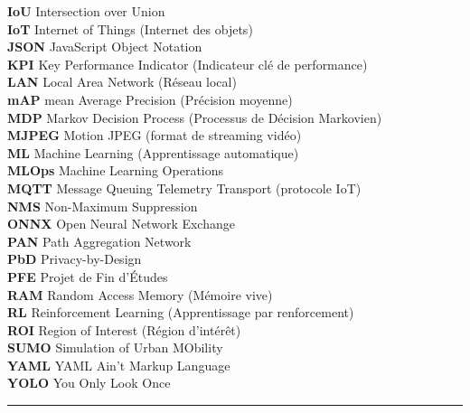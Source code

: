 \begin{tabbing}
\textbf{IoU}   \> Intersection over Union \\[0.2cm]
\textbf{IoT}   \> Internet of Things
               (Internet des objets) \\[0.2cm]
\textbf{JSON}  \> JavaScript Object Notation \\[0.2cm]
\textbf{KPI}   \> Key Performance Indicator
               (Indicateur clé de performance) \\[0.2cm]
\textbf{LAN}   \> Local Area Network
               (Réseau local) \\[0.2cm]
\textbf{mAP}   \> mean Average Precision
               (Précision moyenne) \\[0.2cm]
\textbf{MDP}   \> Markov Decision Process
               (Processus de Décision Markovien) \\[0.2cm]
\textbf{MJPEG} \> Motion JPEG
               (format de streaming vidéo) \\[0.2cm]
\textbf{ML}    \> Machine Learning
               (Apprentissage automatique) \\[0.2cm]
\textbf{MLOps} \> Machine Learning Operations \\[0.2cm]
\textbf{MQTT}  \> Message Queuing Telemetry Transport
               (protocole IoT) \\[0.2cm]
\textbf{NMS}   \> Non-Maximum Suppression \\[0.2cm]
\textbf{ONNX}  \> Open Neural Network Exchange \\[0.2cm]
\textbf{PAN}   \> Path Aggregation Network \\[0.2cm]
\textbf{PbD}   \> Privacy-by-Design \\[0.2cm]
\textbf{PFE}   \> Projet de Fin d'Études \\[0.2cm]
\textbf{RAM}   \> Random Access Memory
               (Mémoire vive) \\[0.2cm]
\textbf{RL}    \> Reinforcement Learning
               (Apprentissage par renforcement) \\[0.2cm]
\textbf{ROI}   \> Region of Interest
               (Région d'intérêt) \\[0.2cm]
\textbf{SUMO}  \> Simulation of Urban MObility \\[0.2cm]
\textbf{YAML}  \> YAML Ain't Markup Language \\[0.2cm]
\textbf{YOLO}  \> You Only Look Once \\[0.2cm]
\end{tabbing}

\vspace{0.3cm}
\rule{\linewidth}{0.4pt}